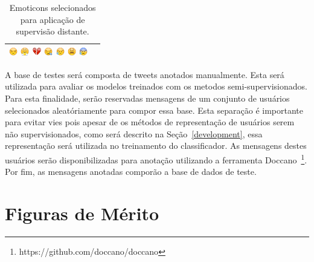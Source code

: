 \begin{table}[h]
\begin{center}
\begin{tabular}{| l | c |}
            \includegraphics[height=1em]{images/emojis/1F612}
            \includegraphics[height=1em]{images/emojis/1F624}
            \includegraphics[height=1em]{images/emojis/1F494}
            \includegraphics[height=1em]{images/emojis/1F62A}
            \includegraphics[height=1em]{images/emojis/1F625}
            \includegraphics[height=1em]{images/emojis/1F62B}
            \includegraphics[height=1em]{images/emojis/1F630}
        \\ \hline
        \end{tabular}
        \caption{Emoticons selecionados para aplicação de supervisão distante.}
        \label{tab:emoticons}
    \end{center}
\end{table}

A base de testes será composta de tweets anotados manualmente.
Esta será utilizada para avaliar os modelos treinados com os metodos
semi-supervisionados.
Para esta finalidade, serão reservadas mensagens de um conjunto de usuários
selecionados aleatóriamente para compor essa base.
Esta separação é importante para evitar vies pois apesar de os métodos de
representação de usuários serem não supervisionados, como será descrito na
Seção~\ref{development}, essa representação será utilizada no treinamento do
classificador.
As mensagens destes usuários serão disponibilizadas para anotação utilizando a
ferramenta Doccano~\footnote{https://github.com/doccano/doccano}.
Por fim, as mensagens anotadas comporão a base de dados de teste.

\section{Figuras de Mérito}


